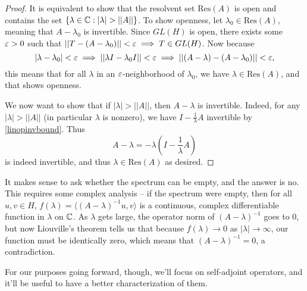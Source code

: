 \begin{proof}
It is equivalent to show that the resolvent set $\text{Res}(A)$ is open and contains the set $\{\lambda \in \mathbb C: |\lambda| > ||A||\}$. To show openness, let $\lambda_0 \in \text{Res}(A)$, meaning that $A - \lambda_0$ is invertible. Since $GL(H)$ is open, there exists some $\varepsilon > 0$ such that $||T - (A - \lambda_0) || < \varepsilon \implies T \in GL(H)$. Now because 
\[
    |\lambda - \lambda_0| < \varepsilon \implies ||\lambda I - \lambda_0 I|| < \varepsilon \implies ||(A - \lambda) - (A - \lambda_0)|| < \varepsilon, 
\]
this means that for all $\lambda$ in an $\varepsilon$-neighborhood of $\lambda_0$, we have $\lambda \in \text{Res}(A)$, and that shows openness. 

We now want to show that if $|\lambda| > ||A||$, then $A - \lambda$ is invertible. Indeed, for any $|\lambda| > ||A||$ (in particular $\lambda$ is nonzero), we have
$I - \frac{1}{\lambda} A$ invertible by \cref{linopinvbound}. Thus
\[
    A - \lambda = -\lambda\left(I - \frac{1}{\lambda} A\right)
\]
is indeed invertible, and thus $\lambda \in \text{Res}(A)$ as desired. 
\end{proof}

\begin{remark}
It makes sense to ask whether the spectrum can be empty, and the answer is no. This requires some complex analysis -- if the spectrum were empty, then for all $u, v \in H$, $f(\lambda) = \langle (A - \lambda)^{-1}u, v \rangle$ is a continuous, complex differentiable function in $\lambda$ on $\mathbb C$. As $\lambda$ gets large, the operator norm of $(A - \lambda)^{-1}$ goes to $0$, but now Liouville's theorem tells us that because $f(\lambda) \to 0$ as $|\lambda| \to \infty$, our function must be identically zero, which means that $(A - \lambda)^{-1} = 0$, a contradiction.
\end{remark}

For our purposes going forward, though, we'll focus on self-adjoint operators, and it'll be useful to have a better characterization of them. 

